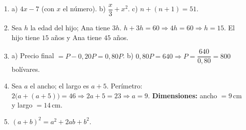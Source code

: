 \documentclass[12pt, letterpaper]{article}
\begin{document}
  \begin{enumerate}[leftmargin=*, label=\textbf{\arabic*.}]
    \item a) $4x - 7$ (con $x$ el número). \quad b) $\dfrac{x}{3} + x^2$. \quad c) $n + (n+1) = 51$.

    \item Sea $h$ la edad del hijo; Ana tiene $3h$. \quad $h + 3h = 60 \Rightarrow 4h = 60 \Rightarrow h = 15$.
          El hijo tiene $15$ años y Ana tiene $45$ años.

    \item a) Precio final $= P - 0{,}20P = 0{,}80P$. \quad b) $0{,}80P = 640 \Rightarrow P = \dfrac{640}{0{,}80} = 800$ bolívares.

    \item Sea $a$ el ancho; el largo es $a + 5$. Perímetro: $2\big(a + (a+5)\big) = 46 \Rightarrow 2a + 5 = 23 \Rightarrow a = 9$.
          \textbf{Dimensiones:} ancho $= 9$\,cm y largo $= 14$\,cm.

    \item $(a + b)^2 = a^2 + 2ab + b^2$.
  \end{enumerate}

\fi
\end{document}
